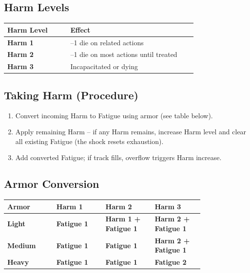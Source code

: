 \documentclass[10pt,twocolumn]{article}
\begin{document}
\subsection{Harm Levels}
\begin{coretable}
\begin{tabular}{>{\bfseries}p{0.3\linewidth} p{0.6\linewidth}}
\toprule
\textbf{Harm Level} & \textbf{Effect} \\
\midrule
Harm 1 & --1 die on related actions \\
Harm 2 & --1 die on most actions until treated \\
Harm 3 & Incapacitated or dying \\
\bottomrule
\end{tabular}
\end{coretable}

\subsection{Taking Harm (Procedure)}
\begin{enumerate}
    \item Convert incoming Harm to Fatigue using armor (see table below).
    \item Apply remaining Harm -- if any Harm remains, increase Harm level and clear all existing Fatigue (the shock resets exhaustion).
    \item Add converted Fatigue; if track fills, overflow triggers Harm increase.
\end{enumerate}

\subsection{Armor Conversion}
\begin{coretable}
\begin{tabular}{>{\bfseries}p{0.2\linewidth} >{\bfseries}p{0.2\linewidth} >{\bfseries}p{0.2\linewidth} >{\bfseries}p{0.2\linewidth}}
\toprule
\textbf{Armor} & \textbf{Harm 1} & \textbf{Harm 2} & \textbf{Harm 3} \\
\midrule
Light & Fatigue 1 & Harm 1 + Fatigue 1 & Harm 2 + Fatigue 1 \\
Medium & Fatigue 1 & Fatigue 1 & Harm 2 + Fatigue 1 \\
Heavy & Fatigue 1 & Fatigue 1 & Fatigue 2 \\
\bottomrule
\end{tabular}
\end{coretable}
\end{document}
